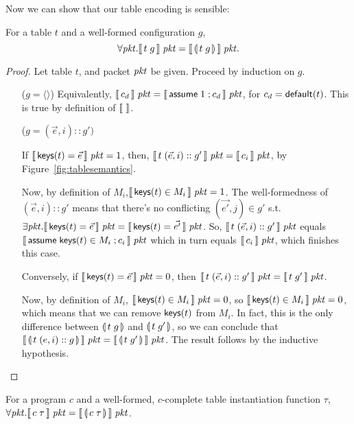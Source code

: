 Now we can show that our table encoding is sensible:

\begin{lemma}
  \label{lem:table-encoding}
  For a table $t$ and a well-formed configuration $g$,
  \[\forall \mathit{pkt}. \llbracket\,t\; g\,\rrbracket\; \mathit{pkt} = \llbracket\,\llparenthesis\, t\; g\, \rrparenthesis\,\rrbracket\;
  \mathit{pkt}.\]

\end{lemma}

\begin{proof}
  Let table $t$, and packet $\mathit{pkt}$ be given. Proceed by induction on
  $g$.
  \begin{enumerate}[align=left]
  \item[($g = \langle \rangle$)] Equivalently,
    $\llbracket\,c_d\,\rrbracket\;\mathit{pkt} = \llbracket\,\mathsf{assume}\; 1\;; c_d\,\rrbracket\; \mathit{pkt}$, for
    $c_d = \mathsf{default}(t)$. This is true by definition of $\llbracket\,\,\rrbracket$.

  \item[($g = (\vec e,i)::g')$] 
    
    If $\llbracket\,\mathsf{keys}(t) = \vec e\,\rrbracket\; \mathit{pkt} = 1$, then,
    $\llbracket\,t\; (\vec e, i)::g'\,\rrbracket\;\mathit{pkt} = \llbracket\,c_i\,\rrbracket\; \mathit{pkt}$, by
    Figure~\ref{fig:tablesemantics}.

    Now, by definition of $M_i$,$\llbracket\,\mathsf{keys}(t) \in M_i\,\rrbracket\; \mathit{pkt} =
    1$. The well-formedness of $(\vec e, i)::g'$ means that there's no
    conflicting $(\vec{e'}, j) \in g'$ s.t.
    $\exists \mathit{pkt}. \llbracket\,\mathsf{keys}(t) = \vec{e}\,\rrbracket\; \mathit{pkt} = \llbracket\,\mathsf{keys}(t)
      = \vec{e'}\,\rrbracket\; \mathit{pkt}$.  So, $\llbracket\,t\; (\vec e,i)::g'\,\rrbracket\; \mathit{pkt}$
    equals $\llbracket\,\mathsf{assume}\; \mathsf{keys}(t) \in M_i\;; c_i\,\rrbracket\;\mathit{pkt}$ which in
    turn equals $\llbracket\,c_i\,\rrbracket\; \mathit{pkt}$, which finishes this case.
    
    Conversely, if $\llbracket\,\mathsf{keys}(t) = \vec e\,\rrbracket\; \mathit{pkt} = 0$, then
    $\llbracket\,t\; (\vec e, i)::g'\,\rrbracket\;\mathit{pkt} = \llbracket\,t\;g'\,\rrbracket\;\mathit{pkt}$.

    Now, by definition of $M_i$,
    $\llbracket\,\mathsf{keys}(t) \in M_i\,\rrbracket\; \mathit{pkt} = 0$, so
    $\llbracket\,\mathsf{keys}(t) \in M_i\,\rrbracket\; \mathit{pkt} = 0$, which means that we can
    remove $\mathsf{keys}(t)$ from $M_i$. In fact, this is the only difference
    between $\llparenthesis\, t\;g\, \rrparenthesis$ and $\llparenthesis\, t\;g'\, \rrparenthesis$, so we can conclude
    that
    $\llbracket\,\llparenthesis\, t\;(e,i)::g\, \rrparenthesis\,\rrbracket\;\mathit{pkt} =
    \llbracket\,\llparenthesis\, t\;g'\, \rrparenthesis\,\rrbracket\;\mathit{pkt}$. The result follows by the
    inductive hypothesis.
  \end{enumerate}
  
\end{proof}

\begin{proposition}
  For a program $c$ and a well-formed, $c$-complete table
  instantiation function $\tau$,
  $\forall \mathit{pkt}. \llbracket\,c\; \tau\,\rrbracket\;\mathit{pkt} = \llbracket\,\llparenthesis\, c\;
      \tau\, \rrparenthesis\,\rrbracket\; \mathit{pkt}$.
\end{proposition}


